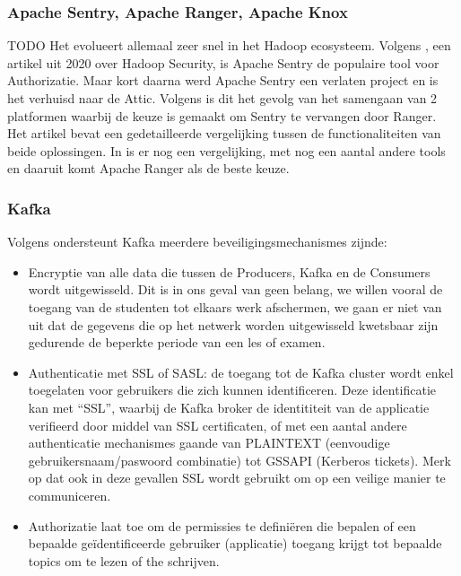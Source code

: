 \subsubsection{Apache Sentry, Apache Ranger, Apache Knox} TODO
Het evolueert allemaal zeer snel in het Hadoop ecosysteem. Volgens \textcite{Chu2020}, een artikel uit 2020 over Hadoop Security, is Apache Sentry de populaire tool voor Authorizatie. Maar kort daarna werd Apache Sentry een verlaten project en is het verhuisd naar de Attic.
\newline
Volgens \textcite{Anand2021} is dit het gevolg van het samengaan van 2 platformen waarbij de keuze is gemaakt om Sentry te vervangen door Ranger. Het artikel bevat een gedetailleerde vergelijking tussen de functionaliteiten van beide oplossingen.
\newline
In \textcite{Soo2020} is er nog een vergelijking, met nog een aantal andere tools en daaruit komt Apache Ranger als de beste keuze.


\subsubsection {Kafka}
Volgens \textcite{Maarek2018} ondersteunt Kafka meerdere beveiligingsmechanismes zijnde:
\begin{itemize}
    \item Encryptie van alle data die tussen de Producers, Kafka en de Consumers wordt uitgewisseld. Dit is in ons geval van geen belang, we willen vooral de toegang van de studenten tot elkaars werk afschermen, we gaan er niet van uit dat de gegevens die op het netwerk worden uitgewisseld kwetsbaar zijn gedurende de beperkte periode van een les of examen.
    \item Authenticatie met SSL of SASL: de toegang tot de Kafka cluster wordt enkel toegelaten voor gebruikers die zich kunnen identificeren. Deze identificatie kan met ``SSL'', waarbij de Kafka broker de identititeit van de applicatie verifieerd door middel van SSL certificaten, of met een aantal andere authenticatie mechanismes gaande van PLAINTEXT (eenvoudige gebruikersnaam/paswoord combinatie) tot GSSAPI (Kerberos tickets). Merk op dat ook in deze gevallen SSL wordt gebruikt om op een veilige manier te communiceren.
    \item Authorizatie laat toe om de permissies te definiëren die bepalen of een bepaalde geïdentificeerde gebruiker (applicatie) toegang krijgt tot bepaalde topics om te lezen of the schrijven.
\end{itemize}

